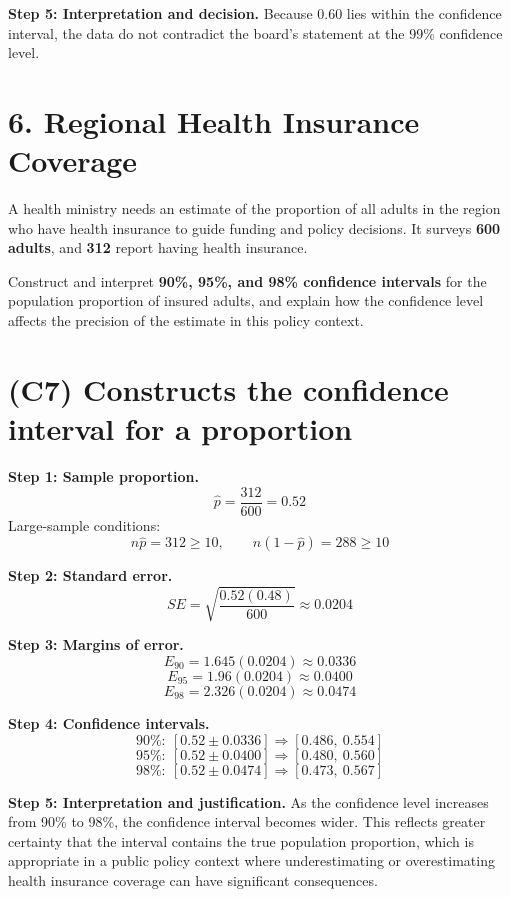 	\textbf{Step 5: Interpretation and decision.}
	Because 0.60 lies within the confidence interval, the data do not contradict the board’s statement at the 99\% confidence level.
	
	\section*{6. Regional Health Insurance Coverage}
	
	A health ministry needs an estimate of the proportion of all adults in the region who have health insurance to guide funding and policy decisions. It surveys \textbf{600 adults}, and \textbf{312} report having health insurance.
	
	Construct and interpret \textbf{90\%, 95\%, and 98\% confidence intervals} for the population proportion of insured adults, and explain how the confidence level affects the precision of the estimate in this policy context.
	
	\section{(C7) Constructs the confidence interval for a proportion}
	
	\textbf{Step 1: Sample proportion.}
	\[
	\hat{p} = \frac{312}{600} = 0.52
	\]
	Large-sample conditions:
	\[
	n\hat{p} = 312 \ge 10, \qquad n(1-\hat{p}) = 288 \ge 10
	\]
	
	\textbf{Step 2: Standard error.}
	\[
	SE = \sqrt{\frac{0.52(0.48)}{600}} \approx 0.0204
	\]
	
	\textbf{Step 3: Margins of error.}
	\[
	E_{90} = 1.645(0.0204) \approx 0.0336
	\]
	\[
	E_{95} = 1.96(0.0204) \approx 0.0400
	\]
	\[
	E_{98} = 2.326(0.0204) \approx 0.0474
	\]
	
	\textbf{Step 4: Confidence intervals.}
	\[
	90\%:\ [0.52 \pm 0.0336] \Rightarrow [0.486,\ 0.554]
	\]
	\[
	95\%:\ [0.52 \pm 0.0400] \Rightarrow [0.480,\ 0.560]
	\]
	\[
	98\%:\ [0.52 \pm 0.0474] \Rightarrow [0.473,\ 0.567]
	\]
	
	\textbf{Step 5: Interpretation and justification.}
	As the confidence level increases from 90\% to 98\%, the confidence interval becomes wider. This reflects greater certainty that the interval contains the true population proportion, which is appropriate in a public policy context where underestimating or overestimating health insurance coverage can have significant consequences.

